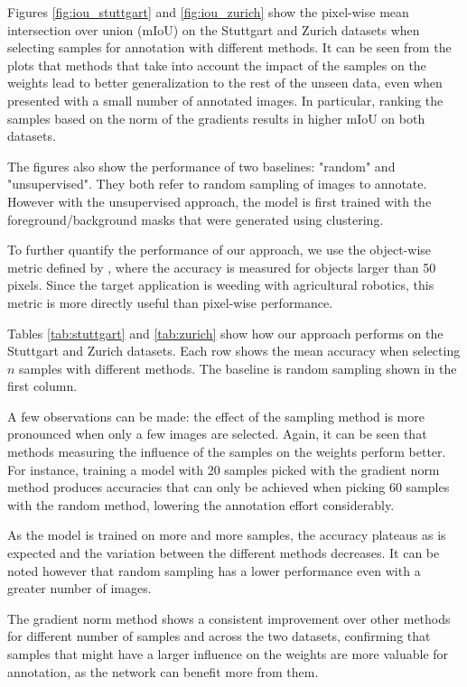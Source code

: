 Figures \ref{fig:iou_stuttgart} and \ref{fig:iou_zurich} show the pixel-wise mean intersection over union (mIoU) on the Stuttgart and Zurich datasets when selecting samples for annotation with different methods. It can be seen from the plots that methods that take into account the impact of the samples on the weights lead to better generalization to the rest of the unseen data, even when presented with a small number of annotated images. In particular, ranking the samples based on the norm of the gradients results in higher mIoU on both datasets.

The figures also show the performance of two baselines: "random" and "unsupervised". They both refer to random sampling of images to annotate. However with the unsupervised approach, the model is first trained with the foreground/background masks that were generated using clustering. 

To further quantify the performance of our approach, we use the object-wise metric defined by \cite{milioto2018real}, where the accuracy is measured for objects larger than 50 pixels. Since the target application is weeding with agricultural robotics, this metric is more directly useful than pixel-wise performance.  


Tables \ref{tab:stuttgart} and \ref{tab:zurich} show how our approach performs on the Stuttgart and Zurich datasets. Each row shows the mean accuracy when selecting $n$ samples with different methods. The baseline is random sampling shown in the first column.


A few observations can be made: the effect of the sampling method is more pronounced when only a few images are selected. Again, it can be seen that methods measuring the influence of the samples on the weights perform better. For instance, training a model with 20 samples picked with the gradient norm method produces accuracies that can only be achieved when picking 60 samples with the random method, lowering the annotation effort considerably.

As the model is trained on more and more samples, the accuracy plateaus as is expected and the variation between the different methods decreases. It can be noted however that random sampling has a lower performance even with a greater number of images.

The gradient norm method shows a consistent improvement over other methods for different number of samples and across the two datasets, confirming that samples that might have a larger influence on the weights are more valuable for annotation, as the network can benefit more from them.

